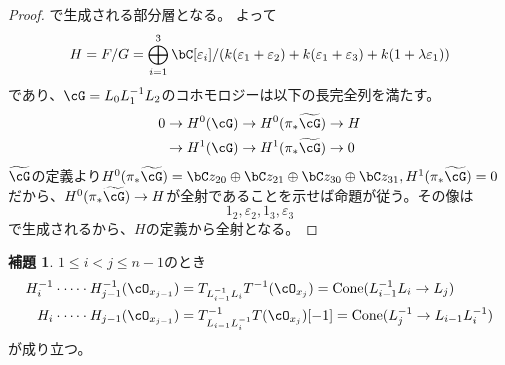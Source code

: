 \documentclass[uplatex, a4paper, dvipdfmx]{jsarticle}
\theoremstyle{definition}
\newtheorem{lemma}[theorem]{補題}
\DeclareMathOperator{\Cone}{\mathrm{Cone}}
\begin{document}
\begin{proof}
    で生成される部分層となる。
    よって
    \begin{equation}
        H = F/G = \bigoplus_{i=1}^3 \bC[\varepsilon_i]/(k(\varepsilon_1 + \varepsilon_2) + k( \varepsilon_1 + \varepsilon_3) + k(1 + \lambda \varepsilon_1))
    \end{equation}
    であり、$\cG = L_0L_1^{-1}L_2$のコホモロジーは以下の長完全列を満たす。
    \begin{align}
        0 & \to H^0(\cG) \to H^0(\pi_*\widetilde{\cG}) \to H \\
          & \to H^1(\cG) \to H^1(\pi_*\widetilde{\cG})\to 0
    \end{align}
    $\widetilde{\cG}$の定義より$H^0(\pi_*\widetilde{\cG}) = \bC z_{20} \oplus \bC z_{21}\oplus \bC z_{30}\oplus \bC z_{31}, H^1(\pi_*\widetilde{\cG}) = 0$だから、$H^0(\pi_*\widetilde{\cG}) \to H$が全射であることを示せば命題が従う。その像は
    \begin{equation}
        1_2, \varepsilon_2, 1_3, \varepsilon_3
    \end{equation}
    で生成されるから、$H$の定義から全射となる。
\end{proof}
\begin{lemma}\label{image_of_ox}
    $1\leq i < j \leq n-1$のとき
    \begin{align}
        H_i^{-1}\cdot\cdots \cdot H_{j-1}^{-1}(\cO_{x_{j-1}}) & = T_{L_{i-1}^{-1}L_i}T^{-1}(\cO_{x_j}) = \Cone(L_{i-1}^{-1}L_i \to L_j)          \\
        H_i\cdot\cdots \cdot H_{j-1}(\cO_{x_{j-1}})           & = T_{L_{i-1}L_i^{-1}}^{-1}T(\cO_{x_j})[-1] = \Cone(L_j^{-1} \to L_{i-1}L_i^{-1})
    \end{align}
    が成り立つ。
\end{lemma}
\end{document}
